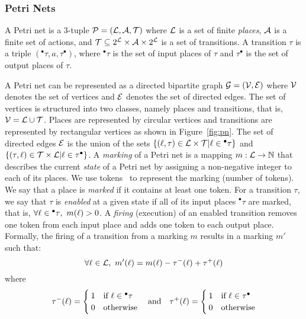 \subsubsection{Petri Nets}
\begin{definition}\label{def:pn}
  A Petri net is a 3-tuple $\mathcal{P}=(\mathcal{L},\mathcal{A},\mathcal{T})$ where $\mathcal{L}$ is a set of finite
  \emph{places}, $\mathcal{A}$ is a finite set of actions, and $\mathcal{T}\subseteq 2^{\mathcal{L}}\times
  \mathcal{A}\times 2^{\mathcal{L}}$ is a set of transitions. A transition $\tau$ is a triple 
  $(^\bullet\tau,a, \tau^{\bullet})$, where $^\bullet\tau$ is the set of input places of 
  $\tau$ and $\tau^{\bullet}$ is 
  the set of output places of $\tau$.
\end{definition}

A Petri net can be represented as a directed bipartite graph $\mathcal{G}=(\mathcal{V},\mathcal{E})$ where 
$\mathcal{V}$ denotes the set of vertices and $\mathcal{E}$ denotes the set of directed edges. 
The set of vertices is structured into two classes, namely places and transitions, 
that is, $\mathcal{V}=\mathcal{L}\cup\mathcal{T}$. 
Places are represented by circular vertices and transitions are represented by rectangular 
vertices as shown in Figure~\ref{fig:pn}. 
The set of directed edges $\mathcal{E}$ is the union of the sets $\{(\ell,\tau)\in\mathcal{L}\times\mathcal{T}|
\ell\in{^\bullet\tau}\}$ and $\{(\tau,\ell)\in\mathcal{T}\times\mathcal{L}|\ell\in\tau^\bullet\}$.
A \emph{marking} of a Petri net is a mapping $m:\mathcal{L}\to\mathbb{N}$ that describes the current
\emph{state} of a Petri net by assigning a non-negative integer to each of its places.
We use tokens~\cite{petri} to represent the marking (number of tokens). We say that a place is
\emph{marked} if it contains at least one token.
For a transition $\tau$, we say that $\tau$ is \emph{enabled} at a given state if all of 
its input places $^\bullet\tau$ are marked, that is, $\forall\loc\in{^\bullet\tau},\ m(\loc)>0$.
A \emph{firing} (execution) of an enabled transition removes one token from each input place
and adds one token to each output place. Formally, the firing of a transition from a marking 
$m$ results in a marking $m'$ such that:
\begin{displaymath}
  \forall\loc\in\Loc, \ m'(\loc)=m(\loc)-\tau^{-}(\loc)+\tau^{+}(\loc) 
\end{displaymath}
where
\begin{displaymath}
  \tau^{-}(\ell)=\begin{cases}
    1 & \text{if }\ell\in{^\bullet\tau}\\
    0 & \text{otherwise} 
  \end{cases}
 \quad \text{and}\quad
\tau^{+}(\ell)=\begin{cases}
    1 & \text{if }\ell\in{\tau^\bullet }\\
    0 & \text{otherwise} 
\end{cases}\end{displaymath}

